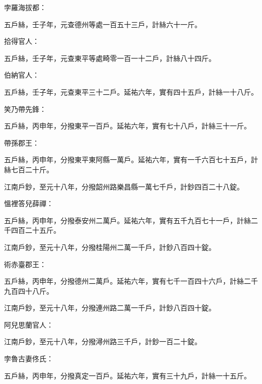 \begin{pinyinscope}
 孛羅海拔都：



 五戶絲，壬子年，元查德州等處一百五十三戶，計絲六十一斤。



 拾得官人：



 五戶絲，壬子年，元查東平等處畸零一百一十二戶，計絲八十四斤。



 伯納官人：



 五戶絲，壬子年，元查東平三十二戶。延祐六年，實有四十五戶，計絲一十八斤。



 笑乃帶先鋒：



 五戶絲，丙申年，分撥東平一百戶。延祐六年，實有七十八戶，計絲三十一斤。



 帶孫郡王：



 五戶絲，丙申年，分撥東平東阿縣一萬戶。延祐六年，實有一千六百七十五戶，計絲七百二十斤。



 江南戶鈔，至元十八年，分撥韶州路樂昌縣一萬七千戶，計鈔四百二十八錠。



 慍裡答兒薛禪：



 五戶絲，丙申年，分撥泰安州二萬戶。延祐六年，實有五千九百七十一戶，計絲二千四百二十五斤。



 江南戶鈔，至元十八年，分撥桂陽州二萬一千戶，計鈔八百四十錠。



 術赤臺郡王：



 五戶絲，丙申年，分撥德州二萬戶。延祐六年，實有七千一百四十六戶，計絲二千九百四十八斤。



 江南戶鈔，至元十八年，分撥連州路二萬一千戶，計鈔八百四十錠。



 阿兒思蘭官人：



 江南戶鈔，至元十八年，分撥潯州路三千戶，計鈔一百二十錠。



 孛魯古妻佟氏：



 五戶絲，丙申年，分撥真定一百戶。延祐六年，實有三十九戶，計絲一十五斤。




\end{pinyinscope}
